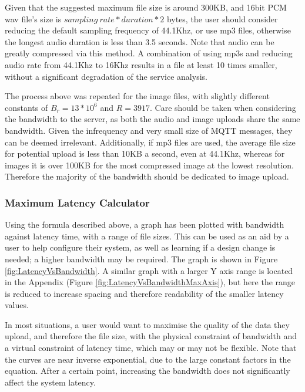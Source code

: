 \documentclass{article}
\begin{document}
Given that the suggested maximum file size is around 300KB, and 16bit PCM wav file's size is $sampling\ rate*duration*2$ bytes, the user should consider reducing the default sampling frequency of 44.1Khz, or use mp3 files, otherwise the longest audio duration is less than 3.5 seconds. Note that audio can be greatly compressed via this method. A combination of using mp3s and reducing audio rate from 44.1Khz to 16Khz results in a file at least 10 times smaller, without a significant degradation of the service analysis.

The process above was repeated for the image files, with slightly different constants of $B_r = 13*10^6$ and $R = 3917$. Care should be taken when considering the bandwidth to the server, as both the audio and image uploads share the same bandwidth. Given the infrequency and very small size of MQTT messages, they can be deemed irrelevant. Additionally, if mp3 files are used, the average file size for potential upload is less than 10KB a second, even at 44.1Khz, whereas for images it is over 100KB for the most compressed image at the lowest resolution. Therefore the majority of the bandwidth should be dedicated to image upload.

\subsubsection{Maximum Latency Calculator}
Using the formula described above, a graph has been plotted with bandwidth against latency time, with a range of file sizes. This can be used as an aid by a user to help configure their system, as well as learning if a design change is needed; a higher bandwidth may be required. The graph is shown in Figure \ref{fig:LatencyVsBandwidth}. A similar graph with a larger Y axis range is located in the Appendix (Figure \ref{fig:LatencyVsBandwidthMaxAxis}), but here the range is reduced to increase spacing and therefore readability of the smaller latency values. 

In most situations, a user would want to maximise the quality of the data they upload, and therefore the file size, with the physical constraint of bandwidth and a virtual constraint of latency time, which may or may not be flexible. Note that the curves are near inverse exponential, due to the large constant factors in the equation. After a certain point, increasing the bandwidth does not significantly affect the system latency.
\end{document}
